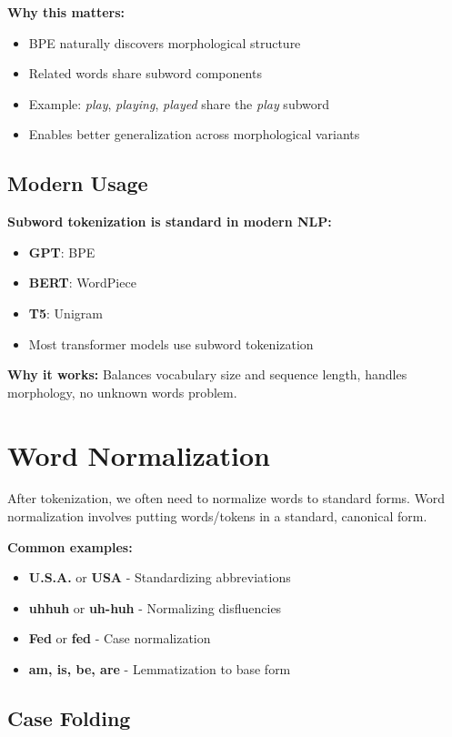 \documentclass[11pt,a4paper]{article}
\theoremstyle{definition}
\theoremstyle{plain}
\theoremstyle{remark}
\begin{document}
\textbf{Why this matters:}
\begin{itemize}
    \item BPE naturally discovers morphological structure
    \item Related words share subword components
    \item Example: \textit{play}, \textit{playing}, \textit{played} share the \textit{play} subword
    \item Enables better generalization across morphological variants
\end{itemize}

\subsection{Modern Usage}

\textbf{Subword tokenization is standard in modern NLP:}
\begin{itemize}
    \item \textbf{GPT}: BPE
    \item \textbf{BERT}: WordPiece  
    \item \textbf{T5}: Unigram
    \item Most transformer models use subword tokenization
\end{itemize}

\textbf{Why it works:} Balances vocabulary size and sequence length, handles morphology, no unknown words problem.

\section{Word Normalization}

After tokenization, we often need to normalize words to standard forms. Word normalization involves putting words/tokens in a standard, canonical form.

\textbf{Common examples:}
\begin{itemize}
    \item \textbf{U.S.A.} or \textbf{USA} - Standardizing abbreviations
    \item \textbf{uhhuh} or \textbf{uh-huh} - Normalizing disfluencies
    \item \textbf{Fed} or \textbf{fed} - Case normalization
    \item \textbf{am, is, be, are} - Lemmatization to base form
\end{itemize}

\subsection{Case Folding}
\end{document}
